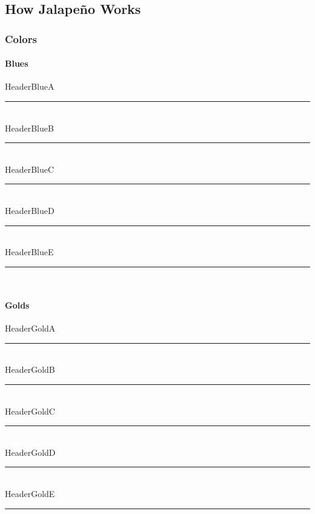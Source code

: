 \documentclass[class=book , crop=false]{standalone}
\title{}  %
\begin{document}

\ifstandalone
\frontmatter %
\maketitle %
\tableofcontents %
\clearpage
\mainmatter %
\fi

\subsection[How Jalape\~no Works]{How Jalape\~no Works}
\subsubsection{Colors}
%
\paragraph[Blues]{Blues\texorpdfstring{\\}{}}
\textcolor{HeaderBlueA}{HeaderBlueA}
\noindent\textcolor{HeaderBlueA}{\rule{.5\textwidth}{.5mm}}\\
\textcolor{HeaderBlueB}{HeaderBlueB}
\noindent\textcolor{HeaderBlueB}{\rule{.5\textwidth}{.5mm}}\\
\textcolor{HeaderBlueC}{HeaderBlueC}
\noindent\textcolor{HeaderBlueC}{\rule{.5\textwidth}{.5mm}}\\
\textcolor{HeaderBlueD}{HeaderBlueD}
\noindent\textcolor{HeaderBlueD}{\rule{.5\textwidth}{.5mm}}\\
\textcolor{HeaderBlueE}{HeaderBlueE}
\noindent\textcolor{HeaderBlueE}{\rule{.5\textwidth}{.5mm}}\\
%
\paragraph[Golds]{Golds\texorpdfstring{\\}{}}
\textcolor{HeaderGoldA}{HeaderGoldA}
\noindent\textcolor{HeaderGoldA}{\rule{.5\textwidth}{.5mm}}\\
\textcolor{HeaderGoldB}{HeaderGoldB}
\noindent\textcolor{HeaderGoldB}{\rule{.5\textwidth}{.5mm}}\\
\textcolor{HeaderGoldC}{HeaderGoldC}
\noindent\textcolor{HeaderGoldC}{\rule{.5\textwidth}{.5mm}}\\
\textcolor{HeaderGoldD}{HeaderGoldD}
\noindent\textcolor{HeaderGoldD}{\rule{.5\textwidth}{.5mm}}\\
\textcolor{HeaderGoldE}{HeaderGoldE}
\noindent\textcolor{HeaderGoldE}{\rule{.5\textwidth}{.5mm}}\\
%
\end{document}
